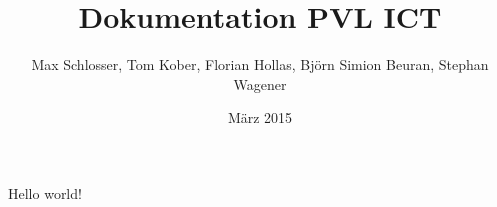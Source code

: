 \documentclass{article}
\title{Dokumentation PVL ICT}
\author{Max Schlosser, Tom Kober, Florian Hollas, Björn Simion Beuran, Stephan Wagener}
\date{M{\"a}rz 2015}
\begin{document}
   \maketitle
   Hello world!
\end{document}
